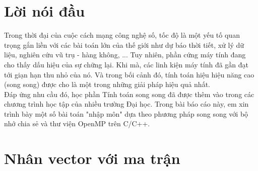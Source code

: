 \documentclass[12pt,a4paper]{report}
\begin{document}
\chapter*{Lời nói đầu}
Trong thời đại của cuộc cách mạng công nghệ số, tốc độ là một yếu tố quan trọng gắn liền với các bài toán lớn của thế giới như dự báo thời tiết, xử lý dữ liệu, nghiên cứu vũ trụ - hàng không, ...  Tuy nhiên, phần cứng máy tính đang cho thấy dấu hiệu của sự chững lại. Khi mà, các linh kiện máy tính đã gần đạt tới giạn hạn thu nhỏ của nó. Và trong bối cảnh đó, tính toán hiệu hiệu năng cao (song song) được cho là một trong những giải pháp hiệu quả nhất. \\
\vskip 1cm
Đáp ứng nhu cầu đó, học phần Tính toán song song đã được thêm vào trong các chương trình học tập của nhiều trường Đại học. Trong bài báo cáo này, em xin trình bày một số bài toán "nhập môn" dựa theo phương pháp song song với bộ nhớ chia sẻ và thư viện OpenMP trên C/C++.


\tableofcontents	                        %


\chapter{Nhân vector với ma trận}         %
\end{document}
